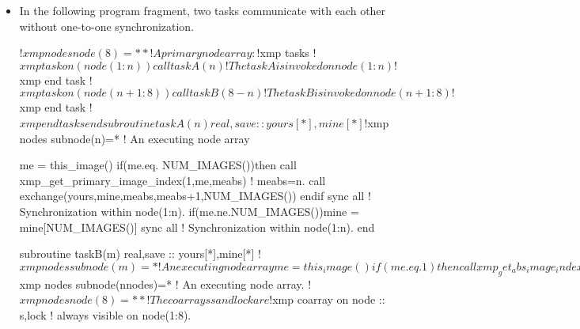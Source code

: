 \begin{itemize}


 \item In the following program fragment, two tasks communicate
with each other without one-to-one synchronization.

\begin{XFexample}
!$xmp nodes node(8)=**       ! A primary node array
        :
!$xmp tasks                        
!$xmp   task on(node(1:n))
          call taskA(n)      ! The taskA is invoked on node(1:n)
!$xmp   end task
!$xmp   task on(node(n+1:8))
          call taskB(8-n)    ! The taskB is invoked on node(n+1:8)
!$xmp   end task
!$xmp end tasks
      end

      subroutine taskA(n)
      real,save :: yours[*],mine[*]
!$xmp nodes subnode(n)=*        ! An executing node array

      me = this_image()
      if(me.eq. NUM_IMAGES())then
         call xmp_get_primary_image_index(1,me,meabs) ! meabs=n.
         call exchange(yours,mine,meabs,meabs+1,NUM_IMAGES())
      endif
      sync all                  ! Synchronization within node(1:n).
      if(me.ne.NUM_IMAGES())mine = mine[NUM_IMAGES()] 
      sync all                  ! Synchronization within node(1:n).
      end

      subroutine taskB(m)
      real,save :: yours[*],mine[*]
!$xmp nodes subnode(m)=*        ! An executing node array

      me = this_image()
      if(me.eq.1)then
         call xmp_get_abs_image_index(1,me,meabs) ! meabs=n+1.
         call exchange(yours,mine,meabs,meabs-1,NUM_IMAGES())
      endif
      sync all                  ! Synchronization within node(n+1:8).
      if(me.ne.1)mine = mine[1]       
      sync all                  ! Synchronization within node(n+1:8).
      end

      subroutine exchange(yours,mine,meabs,iyouabs,nnodes)
      USE, INTRINSIC :: ISO_FORTRAN_ENV
      real :: yours[*],mine[*]
      real, save :: s[*]                       ! only for exchage.
      TYPE(LOCK_TYPE),save :: lock[*]          ! for lock.
!$xmp nodes subnode(nnodes)=*     ! An executing node array.
!$xmp nodes node(8)=**            ! The coarrays s and lock are 
!$xmp coarray on node :: s,lock   ! always visible on node(1:8).


\end{XFexample}
\end{itemize}

